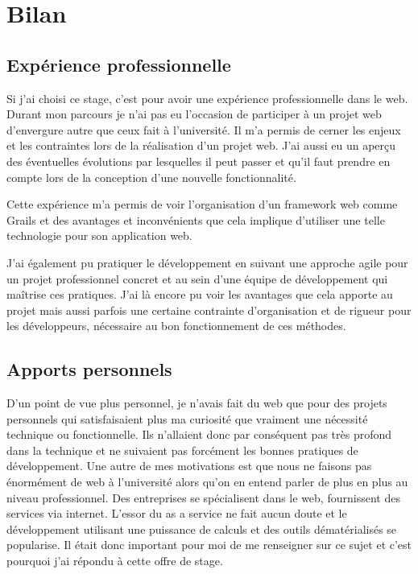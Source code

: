 \chapter{Bilan}

\section{Expérience professionnelle}
Si j'ai choisi ce stage, c'est pour avoir une expérience professionnelle dans le
web. Durant mon parcours je n'ai pas eu l'occasion de participer à un projet web
d'envergure autre que ceux fait à l'université. Il m'a permis de cerner les
enjeux et les contraintes lors de la réalisation d'un projet web. J'ai aussi eu
un aperçu des éventuelles évolutions par lesquelles il peut passer et qu'il faut
prendre en compte lors de la conception d'une nouvelle fonctionnalité.

Cette expérience m'a permis de voir l'organisation d'un framework web comme
Grails et des avantages et inconvénients que cela implique d'utiliser une telle
technologie pour son application web.

J'ai également pu pratiquer le développement en suivant une approche agile pour
un projet professionnel concret et au sein d'une équipe de développement qui
maîtrise ces pratiques. J'ai là encore pu voir les avantages que cela apporte au
projet mais aussi parfois une certaine contrainte d'organisation et de rigueur
pour les développeurs, nécessaire au bon fonctionnement de ces méthodes.

\section{Apports personnels}
D'un point de vue plus personnel, je n'avais fait du web que pour des projets
personnels qui sa\-tisfaisaient plus ma curiosité que vraiment une nécessité
technique ou fonctionnelle. Ils n'allaient donc par conséquent pas très profond
dans la technique et ne suivaient pas forcément les bonnes pratiques de
développement. Une autre de mes motivations est que nous ne faisons pas
énormément de web à l'université alors qu'on en entend parler de plus en plus au
niveau professionnel. Des entreprises se spécialisent dans le web, fournissent
des services via internet. L'essor du \og as a service \fg{} ne fait aucun doute
et le développement utilisant une puissance de calculs et des outils
dématérialisés se popularise. Il était donc important pour moi de me renseigner
sur ce sujet et c'est pourquoi j'ai répondu à cette offre de stage.\\

